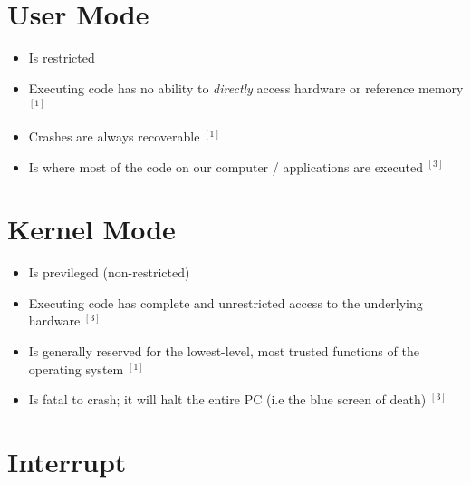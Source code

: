 \documentclass[12pt]{article}
\begin{document}
\section{User Mode}

\begin{itemize}
    \item Is restricted
    \item Executing code has no ability to \textit{directly} access
    hardware or reference memory $^{[1]}$
    \item Crashes are always recoverable $^{[1]}$
    \item Is where most of the code on our computer / applications are executed $^{[3]}$
\end{itemize}

\section{Kernel Mode}
\begin{itemize}
    \item Is previleged (non-restricted)
    \item Executing code has complete and unrestricted access to the underlying hardware $^{[3]}$
    \item Is generally reserved for the lowest-level, most trusted functions of the operating
    system $^{[1]}$
    \item Is fatal to crash; it will halt the entire PC (i.e the blue screen of death) $^{[3]}$
\end{itemize}

\section{Interrupt}
\end{document}
